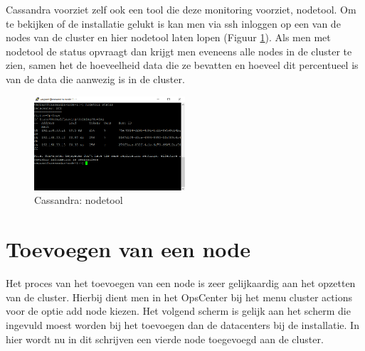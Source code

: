 Cassandra voorziet zelf ook een tool die deze monitoring voorziet, nodetool.
Om te bekijken of de installatie gelukt is kan men via ssh inloggen op een van de nodes van de cluster en hier nodetool laten lopen (Figuur \ref{fig:cas_nodetool}).
Als men met nodetool de status opvraagt dan krijgt men eveneens alle nodes in de cluster te zien, samen het de hoeveelheid data die ze bevatten en hoeveel dit percentueel is van de data die aanwezig is in de cluster.

\begin{figure}[H]
	\centering
	\includegraphics[width=0.5\textwidth]{img/4_1_installatie_cassandra/3_Node_setup}
	\caption{Cassandra: nodetool}
	\label{fig:cas_nodetool}
\end{figure}

\section{Toevoegen van een node}
Het proces van het toevoegen van een node is zeer gelijkaardig aan het opzetten van de cluster.
Hierbij dient men in het OpsCenter bij het menu cluster actions voor de optie add node kiezen.
Het volgend scherm is gelijk aan het scherm die ingevuld moest worden bij het toevoegen dan de datacenters bij de installatie.
In hier wordt nu in dit schrijven een vierde node toegevoegd aan de cluster.